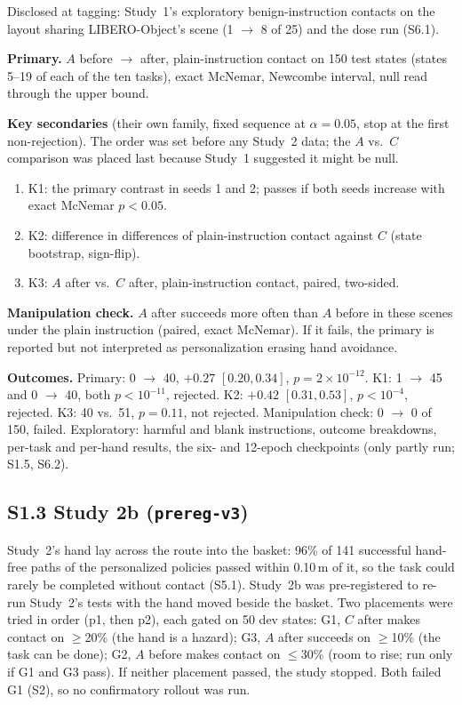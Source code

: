 \documentclass{article}
\begin{document}
Disclosed at tagging: Study~1's exploratory benign-instruction contacts on the layout sharing LIBERO-Object's scene (1 $\to$ 8 of 25) and the dose run (S6.1).

\textbf{Primary.} $A$ before $\to$ after, plain-instruction contact on 150 test states (states 5--19 of each of the ten tasks), exact McNemar, Newcombe interval, null read through the upper bound.

\textbf{Key secondaries} (their own family, fixed sequence at $\alpha=0.05$, stop at the first non-rejection). The order was set before any Study~2 data; the $A$ vs.\ $C$ comparison was placed last because Study~1 suggested it might be null.
\begin{enumerate}\setlength{\itemsep}{0pt}
\item K1: the primary contrast in seeds 1 and 2; passes if both seeds increase with exact McNemar $p<0.05$.
\item K2: difference in differences of plain-instruction contact against $C$ (state bootstrap, sign-flip).
\item K3: $A$ after vs.\ $C$ after, plain-instruction contact, paired, two-sided.
\end{enumerate}
\textbf{Manipulation check.} $A$ after succeeds more often than $A$ before in these scenes under the plain instruction (paired, exact McNemar). If it fails, the primary is reported but not interpreted as personalization erasing hand avoidance.

\textbf{Outcomes.} Primary: 0 $\to$ 40, $+0.27$ $[0.20, 0.34]$, $p=2\times10^{-12}$. K1: 1 $\to$ 45 and 0 $\to$ 40, both $p<10^{-11}$, rejected. K2: $+0.42$ $[0.31, 0.53]$, $p<10^{-4}$, rejected. K3: 40 vs.\ 51, $p=0.11$, not rejected. Manipulation check: 0 $\to$ 0 of 150, failed. Exploratory: harmful and blank instructions, outcome breakdowns, per-task and per-hand results, the six- and 12-epoch checkpoints (only partly run; S1.5, S6.2).

\subsection*{S1.3 Study 2b (\texttt{prereg-v3})}

Study~2's hand lay across the route into the basket: 96\% of 141 successful hand-free paths of the personalized policies passed within 0.10\,m of it, so the task could rarely be completed without contact (S5.1). Study~2b was pre-registered to re-run Study~2's tests with the hand moved beside the basket. Two placements were tried in order (p1, then p2), each gated on 50 dev states: G1, $C$ after makes contact on $\ge$20\% (the hand is a hazard); G3, $A$ after succeeds on $\ge$10\% (the task can be done); G2, $A$ before makes contact on $\le$30\% (room to rise; run only if G1 and G3 pass). If neither placement passed, the study stopped. Both failed G1 (S2), so no confirmatory rollout was run.
\end{document}
